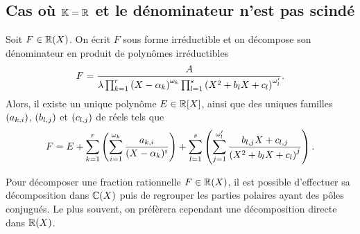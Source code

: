 \documentclass{magnolia}
\begin{document}


\subsection{Cas où $\mathbb{K}=\mathbb{R}$ et le dénominateur n'est pas scindé}

\begin{proposition}
Soit $F\in\fracR$. On écrit $F$ sous forme irréductible et on
décompose son dénominateur en produit de polynômes irréductibles
\[F=\frac{A}{\lambda \prod_{k=1}^r \left(X-\alpha_k\right)^{\omega_k}
    \prod_{l=1}^s \left(X^2+b_lX+c_l\right)^{\omega_l'}}.\]
Alors, il existe un unique polynôme $E\in\polyR$, ainsi que des uniques familles
$\left(a_{k,i}\right)$, $\left(b_{l,j}\right)$ et $\left(c_{l,j}\right)$ de réels tels que
\[F=E+\sum_{k=1}^r \left(\sum_{i=1}^{\omega_k} \frac{a_{k,i}}{(X-\alpha_k)^i}\right)
 +\sum_{l=1}^s \left(\sum_{j=1}^{\omega_l'} \frac{b_{l,j}X+c_{l,j}}{\left(X^2+b_lX+c_l\right)^j}\right).\]
\end{proposition}

\begin{remarqueUnique}
\remarque Pour décomposer une fraction rationnelle $F\in\fracR$, il est possible
  d'effectuer sa décomposition dans $\fracC$ puis de regrouper les parties polaires
  ayant des pôles conjugués. Le plus souvent, on préfèrera cependant une décomposition
  directe dans $\fracR$.
\end{remarqueUnique}
\end{document}
